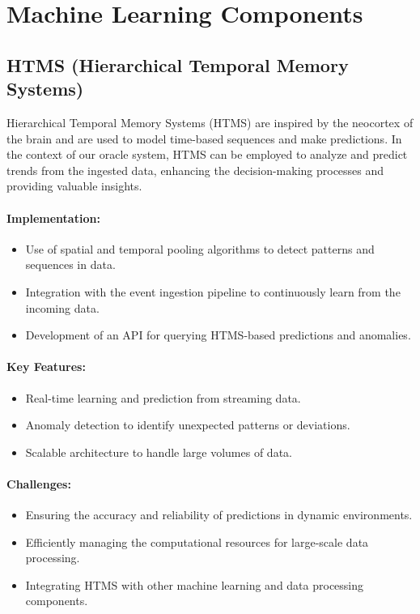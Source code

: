 \documentclass[12pt,a4paper]{article}
\begin{document}
	\section{Machine Learning Components}
	\subsection{HTMS (Hierarchical Temporal Memory Systems)}
	Hierarchical Temporal Memory Systems (HTMS) are inspired by the neocortex of the brain and are used to model time-based sequences and make predictions. In the context of our oracle system, HTMS can be employed to analyze and predict trends from the ingested data, enhancing the decision-making processes and providing valuable insights.
	
	\paragraph{Implementation:}
	\begin{itemize}
		\item Use of spatial and temporal pooling algorithms to detect patterns and sequences in data.
		\item Integration with the event ingestion pipeline to continuously learn from the incoming data.
		\item Development of an API for querying HTMS-based predictions and anomalies.
	\end{itemize}
	
	\paragraph{Key Features:}
	\begin{itemize}
		\item Real-time learning and prediction from streaming data.
		\item Anomaly detection to identify unexpected patterns or deviations.
		\item Scalable architecture to handle large volumes of data.
	\end{itemize}
	
	\paragraph{Challenges:}
	\begin{itemize}
		\item Ensuring the accuracy and reliability of predictions in dynamic environments.
		\item Efficiently managing the computational resources for large-scale data processing.
		\item Integrating HTMS with other machine learning and data processing components.
	\end{itemize}
	
\end{document}
